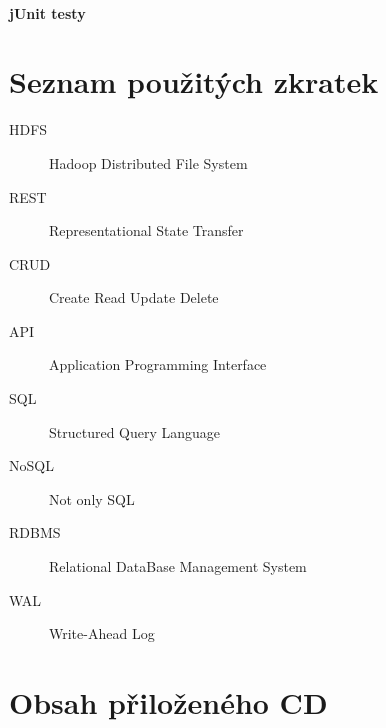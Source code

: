 \documentclass[thesis=M,czech]{FITthesis}[2012/06/26]
\begin{document}
\subsubsection{jUnit testy}



\begin{conclusion}
\end{conclusion}




\appendix

\chapter{Seznam použitých zkratek}
\begin{description}
	\item[HDFS] Hadoop Distributed File System
	\item[REST] Representational State Transfer
	\item[CRUD] Create Read Update Delete
	\item[API] Application Programming Interface
	\item[SQL] Structured Query Language
	\item[NoSQL] Not only SQL
	\item[RDBMS] Relational DataBase Management System
	\item[WAL] Write-Ahead Log
	

\end{description}



\chapter{Obsah přiloženého CD}


\begin{figure}
\end{figure}
\end{document}
